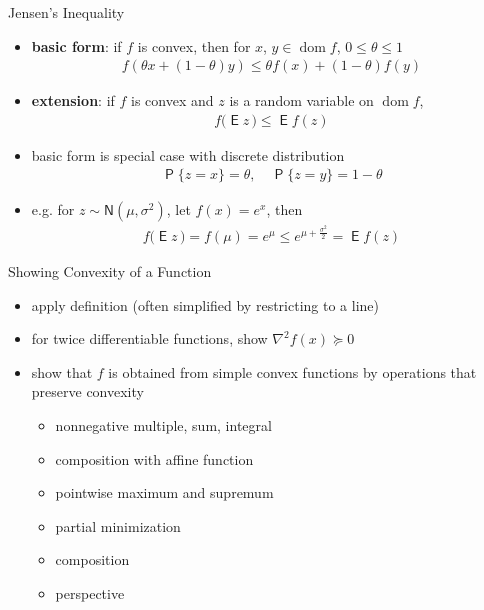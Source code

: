 \documentclass[10pt]{beamer}
\newcommand{\ds}{\displaystyle}
\DeclareMathOperator*{\dom}{dom}
\DeclareMathOperator*\prb{\mathsf{P}}
\DeclareMathOperator*\expc{\mathsf{E}}
\theoremstyle{definition}
\begin{document}
\begin{frame}{Jensen's Inequality}
  \begin{itemize}
    \item {\bf basic form}: if $f$ is convex, then for $x$, $y\in\dom f$, $0\leqslant\theta\leqslant 1$
      \begin{align*}
        f(\theta x + (1 - \theta) y) \leqslant \theta f(x) + (1 - \theta) f(y)
      \end{align*}
    \item {\bf extension}: if $f$ is convex and $z$ is a random variable on $\dom f$,
      \begin{align*}
        f\big(\expc{z}\,\big) \leqslant \expc{f(z)}
      \end{align*}
    \item basic form is special case with discrete distribution
      \begin{align*}
        \prb\{z = x\} = \theta,\quad\prb\{z = y\} = 1 - \theta
      \end{align*}
    \item e.g. for $\ds z\sim\mathsf{N}(\mu,\sigma^2)$, let $\ds f(x) = e^x$, then
      \begin{align*}
        f\big(\expc{z}\,\big) = f(\mu) = e^{\mu}\leqslant e^{\mu + \frac{\sigma^2}{2}} = \expc{f(z)}
      \end{align*}
  \end{itemize}
\end{frame}

\begin{frame}{Showing Convexity of a Function}
  \begin{itemize}
    \item apply definition (often simplified by restricting to a line)
    \item for twice differentiable functions, show $\ds\nabla^2 f(x)\succcurlyeq 0$
    \item show that $f$ is obtained from simple convex functions by operations that preserve convexity
      \begin{itemize}
        \item nonnegative multiple, sum, integral
        \item composition with affine function
        \item pointwise maximum and supremum
        \item partial minimization
        \item composition
        \item perspective
      \end{itemize}
  \end{itemize}
\end{frame}
\end{document}
